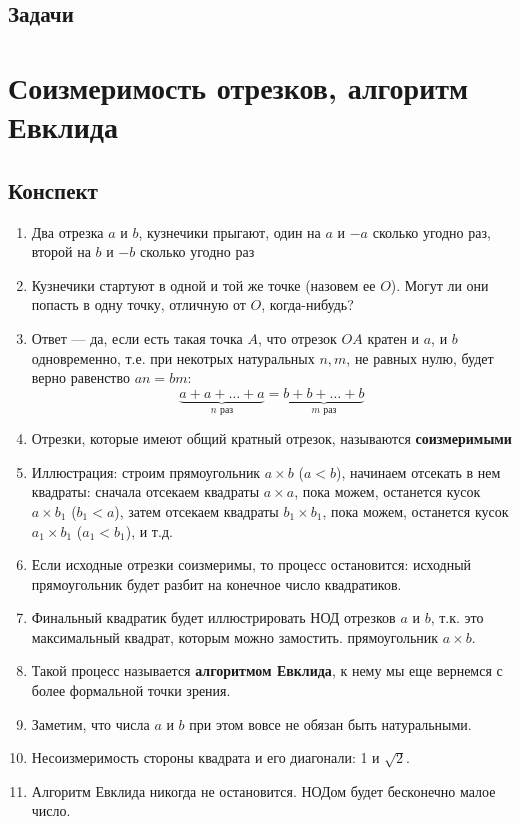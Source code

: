 \subsection{Задачи}



\section{Соизмеримость отрезков, алгоритм Евклида}

\subsection{Конспект}
\begin{enumerate}\setlength{\itemsep}{1pt}
\item Два отрезка $a$ и $b$, кузнечики прыгают, один на $a$ и $-a$ сколько угодно раз, второй на $b$ и $-b$ сколько угодно раз
\item Кузнечики стартуют в одной и той же точке (назовем ее $O$). Могут ли они попасть в одну точку, отличную от $O$, когда-нибудь?
\item Ответ --- да, если есть такая точка $A$, что отрезок $OA$ кратен и $a$, и $b$ одновременно, т.е. при некотрых натуральных $n,m$, не равных нулю, будет верно равенство $an=bm$:
$$
\underbrace{a+a+\dots+a}_{n\mbox{ раз}}=\underbrace{b+b+\dots+b}_{m\mbox{ раз}}
$$
\item Отрезки, которые имеют общий кратный отрезок, называются \textbf{соизмеримыми}
\item Иллюстрация: строим прямоугольник $a\times b$ ($a<b$), начинаем отсекать в нем квадраты: сначала отсекаем квадраты $a\times a$, пока можем, останется кусок $a\times b_1$ ($b_1<a$), затем отсекаем квадраты $b_1\times b_1$, пока можем, останется кусок $a_1\times b_1$ ($a_1<b_1$), и т.д.
\item Если исходные отрезки соизмеримы, то процесс остановится: исходный прямоугольник будет разбит на конечное число квадратиков.
\item Финальный квадратик будет иллюстрировать НОД отрезков $a$ и $b$, т.к. это максимальный квадрат, которым можно замостить. прямоугольник $a\times b$.
\item Такой процесс называется \textbf{алгоритмом Евклида}, к нему мы еще вернемся с более формальной точки зрения.
\item Заметим, что числа $a$ и $b$ при этом вовсе не обязан быть натуральными.
\item Несоизмеримость стороны квадрата и его диагонали: 1 и $\sqrt 2$.
\item Алгоритм Евклида никогда не остановится. НОДом будет бесконечно малое число.
\end{enumerate}
